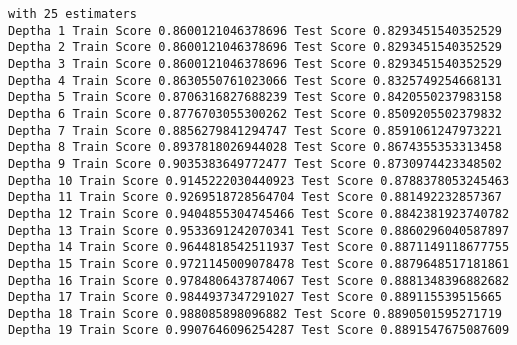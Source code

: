 \documentclass[11pt]{article}
\begin{document}
    \begin{Verbatim}[commandchars=\\\{\}]
with 25 estimaters
Deptha 1 Train Score 0.8600121046378696 Test Score 0.8293451540352529
Deptha 2 Train Score 0.8600121046378696 Test Score 0.8293451540352529
Deptha 3 Train Score 0.8600121046378696 Test Score 0.8293451540352529
Deptha 4 Train Score 0.8630550761023066 Test Score 0.8325749254668131
Deptha 5 Train Score 0.8706316827688239 Test Score 0.8420550237983158
Deptha 6 Train Score 0.8776703055300262 Test Score 0.8509205502379832
Deptha 7 Train Score 0.8856279841294747 Test Score 0.8591061247973221
Deptha 8 Train Score 0.8937818026944028 Test Score 0.8674355353313458
Deptha 9 Train Score 0.9035383649772477 Test Score 0.8730974423348502
Deptha 10 Train Score 0.9145222030440923 Test Score 0.8788378053245463
Deptha 11 Train Score 0.9269518728564704 Test Score 0.881492232857367
Deptha 12 Train Score 0.9404855304745466 Test Score 0.8842381923740782
Deptha 13 Train Score 0.9533691242070341 Test Score 0.8860296040587897
Deptha 14 Train Score 0.9644818542511937 Test Score 0.8871149118677755
Deptha 15 Train Score 0.9721145009078478 Test Score 0.8879648517181861
Deptha 16 Train Score 0.9784806437874067 Test Score 0.8881348396882682
Deptha 17 Train Score 0.9844937347291027 Test Score 0.889115539515665
Deptha 18 Train Score 0.988085898096882 Test Score 0.8890501595271719
Deptha 19 Train Score 0.9907646096254287 Test Score 0.8891547675087609

    \end{Verbatim}
\end{document}
